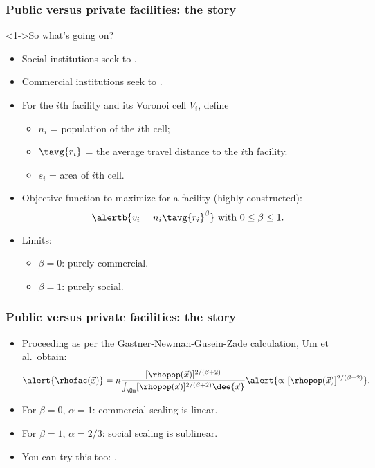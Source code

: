 \begin{frame}
  \frametitle{Public versus private facilities: the story}

  \begin{block}<1->{So what's going on?}
    \begin{itemize}
    \item<1->
      Social institutions seek to .
    \item<2->
      Commercial institutions seek to .
    \item<3->
       For the $i$th facility and its Voronoi cell $V_i$, define
      \begin{itemize}
      \item
        $n_i$ = population of the $i$th cell;
      \item
        $\tavg{r_i}$ = the average travel distance
        to the $i$th facility.
      \item
        $s_i$ = area of $i$th cell.
      \end{itemize}
    \item<4->
      Objective function to maximize for a facility (highly constructed):
      $$ 
      \alertb{v_i = n_i \tavg{r_i}^\beta}
      \
      \mbox{with}
      \
      0 \le \beta \le 1.
      $$
    \item<5->
      Limits:
      \begin{itemize}
      \item $\beta = 0$: purely commercial.
      \item $\beta = 1$: purely social.
      \end{itemize}
    \end{itemize}
  \end{block}

\end{frame}

\begin{frame}
  \frametitle{Public versus private facilities: the story}

  \begin{itemize}
  \item<1-> 
    Proceeding as per the Gastner-Newman-Gusein-Zade calculation,
    Um et al.\ obtain:
    $$
    \alert{\rhofac(\vec{x})}
    =  n
    \frac{[\rhopop(\vec{x})]^{2/(\beta+2)}}
    {\int_{\Om} [\rhopop(\vec{x})]^{2/(\beta+2)} \dee{\vec{x}}}
    \alert{\propto [\rhopop(\vec{x})]^{2/(\beta+2)}}.
    $$
  \item<2-> 
    For $\beta=0$, $\alpha=1$: commercial scaling is linear.
  \item<3-> 
    For $\beta=1$, $\alpha=2/3$: social scaling is sublinear.
  \item<3-> 
    You can try this too: \insertassignmentquestion{04}{4}{3}.
  \end{itemize}

\end{frame}


